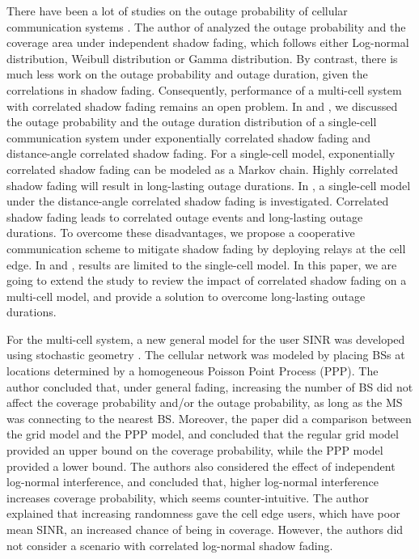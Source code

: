 \documentclass[journal,10pt]{IEEEtran}
\begin{document}
\par There have been a lot of studies on the outage probability of cellular communication systems \cite{abu1991outage, petrovic2013outage, emamian2014outage}. 
The author of \cite{vural2015effect} analyzed the outage probability and the coverage area under independent shadow fading, which follows either Log-normal distribution, Weibull distribution or Gamma distribution. By contrast, there is much less work on the outage probability and outage duration, given the correlations in shadow fading. Consequently, performance of a multi-cell system with correlated shadow fading remains an open problem. In \cite{lu2015long} and \cite{lu2015shining}, we discussed the outage probability and the outage duration distribution of a single-cell communication system under exponentially correlated shadow fading and distance-angle correlated shadow fading. For a single-cell model, exponentially correlated shadow fading can be modeled as a Markov chain. Highly correlated shadow fading will result in long-lasting outage durations. In \cite{lu2015shining}, a single-cell model under the distance-angle correlated shadow fading is investigated. Correlated shadow fading leads to correlated outage events and long-lasting outage durations. To overcome these disadvantages, we propose a cooperative communication scheme to mitigate shadow fading by deploying relays at the cell edge. In \cite{lu2015long} and \cite{lu2015shining}, results are limited to the single-cell model. In this paper, we are going to extend the study to review the impact of correlated shadow fading on a multi-cell model, and provide a solution to overcome long-lasting outage durations.
\par For the multi-cell system, a new general model for the user SINR was developed using stochastic geometry \cite{andrews2011tractable}. The cellular network was modeled by placing BSs at locations determined by a homogeneous Poisson Point Process (PPP). The author concluded that, under general fading, increasing the number of BS did not affect the coverage probability and/or the outage probability, as long as the MS was connecting to the nearest BS. Moreover, the paper did a comparison between the grid model and the PPP model, and concluded that the regular grid model provided an upper bound on the coverage probability, while the PPP model provided a lower bound. The authors also considered the effect of independent log-normal interference, and concluded that, higher log-normal interference increases coverage probability, which seems counter-intuitive. The author explained that increasing randomness gave the cell edge users, which have poor mean SINR, an increased chance of being in coverage. However, the authors did not consider a scenario with correlated log-normal shadow fading. 
\end{document}
